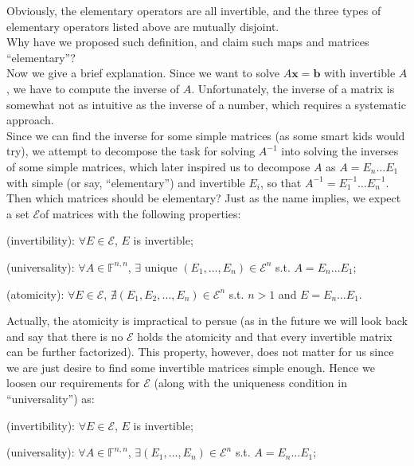 \documentclass{article}
\begin{document}
\begin{Rmk}{}
    \textcolor{Th}{Obviously, the elementary operators are all invertible, and the three types of elementary operators listed above are mutually disjoint.}\\
    Why have we proposed such definition, and claim such maps and matrices ``elementary''?\\
    Now we give a brief explanation. Since we want to solve $A\pmb{x} = \pmb{b}$ with invertible $A$, we have to compute the inverse of $A$. Unfortunately, the inverse of a matrix is somewhat not as intuitive as the inverse of a number, which requires a systematic approach.\\
    Since we can find the inverse for some simple matrices (as some smart kids would try), we attempt to decompose the task for solving $A^{-1}$ into solving the inverses of some simple matrices, which later inspired us to decompose $A$ as $A = E_n\dots E_1$ with simple (or say, ``elementary'') and invertible $E_i$, so that $A^{-1} = E_1^{-1}\dots E_n^{-1}$.\\
    Then which matrices should be elementary? Just as the name implies, we expect a set $\mathcal{E}$of matrices with the following properties: 
    \begin{compactenum}
        \item (invertibility): $\forall E\in\mathcal{E}$, $E$ is invertible;
        \item (universality): $\forall A\in\mathbb{F}^{n,n}$, $\exists$ unique $(E_1, \dots, E_n)\in \mathcal{E}^n$ s.t. $A = E_n\dots E_1$;
        \item (atomicity): $\forall E\in\mathcal{E}$, $\nexists (E_1, E_2, \dots, E_n)\in\mathcal{E}^n$ s.t. $n>1$ and $E = E_n\dots E_1$.
    \end{compactenum}
    Actually, the atomicity is impractical to persue (as in the future we will look back and say that there is no $\mathcal{E}$ holds the atomicity and that every invertible matrix can be further factorized). This property, however, does not matter for us since we are just desire to find some invertible matrices simple enough. Hence we loosen our requirements for $\mathcal{E}$ (along with the uniqueness condition in ``universality'') as:
    \begin{compactenum}
        \item (invertibility): $\forall E\in\mathcal{E}$, $E$ is invertible;
        \item (universality): $\forall A\in\mathbb{F}^{n,n}$, $\exists (E_1, \dots, E_n)\in \mathcal{E}^n$ s.t. $A = E_n\dots E_1$;
    \end{compactenum}
\end{Rmk}
\end{document}
